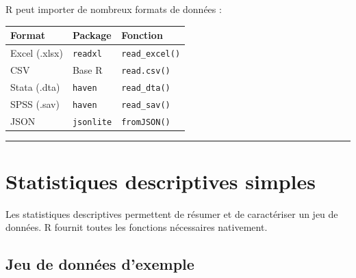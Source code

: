 \documentclass[
  french,
  11pt,
  a4paper,
]{article}
\newcounter{none} %
\begin{document}
\begin{tcolorbox}[enhanced jigsaw, arc=.35mm, bottomrule=.15mm, bottomtitle=1mm, breakable, colback=white, colbacktitle=quarto-callout-note-color!10!white, colframe=quarto-callout-note-color-frame, coltitle=black, left=2mm, leftrule=.75mm, opacityback=0, opacitybacktitle=0.6, rightrule=.15mm, title=\textcolor{quarto-callout-note-color}{\faInfo}\hspace{0.5em}{Autres formats d'importation}, titlerule=0mm, toprule=.15mm, toptitle=1mm]

R peut importer de nombreux formats de données :

{\def\LTcaptype{none} %
\begin{longtable}[]{@{}lll@{}}
\toprule\noalign{}
Format & Package & Fonction \\
\midrule\noalign{}
\endhead
\bottomrule\noalign{}
\endlastfoot
Excel (.xlsx) & \texttt{readxl} & \texttt{read\_excel()} \\
CSV & Base R & \texttt{read.csv()} \\
Stata (.dta) & \texttt{haven} & \texttt{read\_dta()} \\
SPSS (.sav) & \texttt{haven} & \texttt{read\_sav()} \\
JSON & \texttt{jsonlite} & \texttt{fromJSON()} \\
\end{longtable}
}

\end{tcolorbox}

\begin{center}\rule{0.5\linewidth}{0.5pt}\end{center}

\section{Statistiques descriptives
simples}\label{statistiques-descriptives-simples}

Les statistiques descriptives permettent de résumer et de caractériser
un jeu de données. R fournit toutes les fonctions nécessaires
nativement.

\subsection{Jeu de données d'exemple}\label{jeu-de-donnuxe9es-dexemple}
\end{document}

